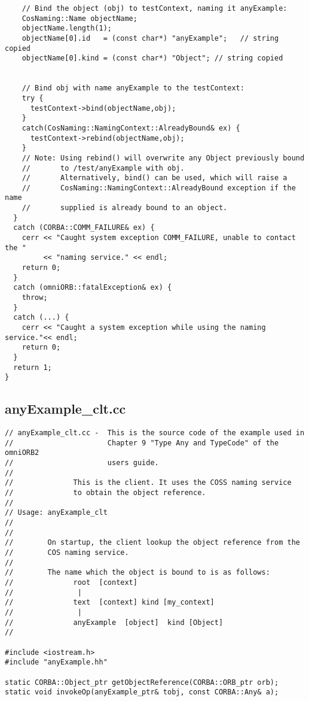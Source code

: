 \documentclass[11pt,twoside,onecolumn]{book}
\begin{document}
{\begin{verbatim}
    // Bind the object (obj) to testContext, naming it anyExample:
    CosNaming::Name objectName;
    objectName.length(1);
    objectName[0].id   = (const char*) "anyExample";   // string copied
    objectName[0].kind = (const char*) "Object"; // string copied


    // Bind obj with name anyExample to the testContext:
    try {
      testContext->bind(objectName,obj);
    }
    catch(CosNaming::NamingContext::AlreadyBound& ex) {
      testContext->rebind(objectName,obj);
    }
    // Note: Using rebind() will overwrite any Object previously bound 
    //       to /test/anyExample with obj.
    //       Alternatively, bind() can be used, which will raise a
    //       CosNaming::NamingContext::AlreadyBound exception if the name
    //       supplied is already bound to an object.
  }
  catch (CORBA::COMM_FAILURE& ex) {
    cerr << "Caught system exception COMM_FAILURE, unable to contact the "
         << "naming service." << endl;
    return 0;
  }
  catch (omniORB::fatalException& ex) {
    throw;
  }
  catch (...) {
    cerr << "Caught a system exception while using the naming service."<< endl;
    return 0;
  }
  return 1;
}

\end{verbatim}

\newpage

\subsection{anyExample\_clt.cc}
\begin{verbatim}
// anyExample_clt.cc -  This is the source code of the example used in 
//                      Chapter 9 "Type Any and TypeCode" of the omniORB2 
//                      users guide.
//
//              This is the client. It uses the COSS naming service
//              to obtain the object reference.
//
// Usage: anyExample_clt
//
//
//        On startup, the client lookup the object reference from the
//        COS naming service.
//
//        The name which the object is bound to is as follows:
//              root  [context]
//               |
//              text  [context] kind [my_context]
//               |
//              anyExample  [object]  kind [Object]
//

#include <iostream.h>
#include "anyExample.hh"

static CORBA::Object_ptr getObjectReference(CORBA::ORB_ptr orb);
static void invokeOp(anyExample_ptr& tobj, const CORBA::Any& a);


\end{verbatim}}
\end{document}
